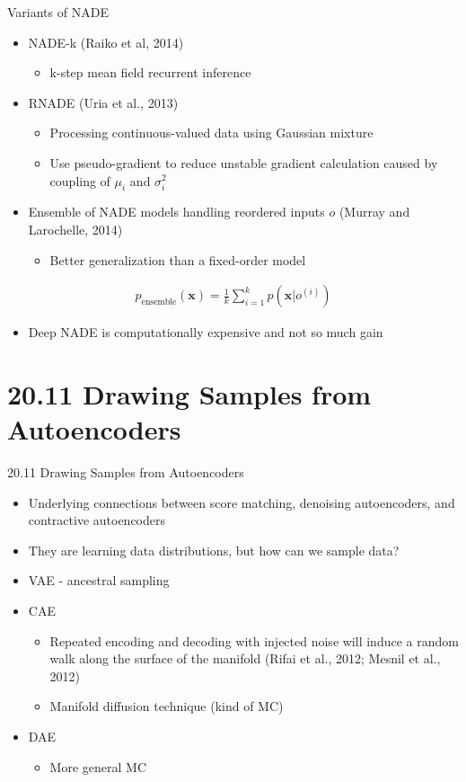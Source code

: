 \documentclass[dvipdfmx,presentation]{beamer}
\def\bf{\mathbf}
\begin{document}
\begin{frame}[label={sec:orgheadline42}]{Variants of NADE}
\begin{itemize}
\item NADE-k (Raiko et al, 2014)
\begin{itemize}
\item k-step mean field recurrent inference
\end{itemize}
\item RNADE (Uria et al., 2013)
\begin{itemize}
\item Processing continuous-valued data using Gaussian mixture
\item Use pseudo-gradient to reduce unstable gradient calculation caused by coupling of \(\mu_{i}\) and \(\sigma_{i}^{2}\)
\end{itemize}
\item Ensemble of NADE models handling reordered inputs \(o\) (Murray and Larochelle, 2014)
\begin{itemize}
\item Better generalization than a fixed-order model
\end{itemize}
\end{itemize}
\begin{align*}
p_{\mathrm{ensemble}}(\bf{x}) = \frac{1}{k} \sum_{i=1}^{k} p(\bf{x} | o^{(i)})
\end{align*}
\begin{itemize}
\item Deep NADE is computationally expensive and not so much gain
\end{itemize}
\end{frame}

\section{20.11 Drawing Samples from Autoencoders}
\label{sec:orgheadline47}
\begin{frame}[label={sec:orgheadline44}]{20.11 Drawing Samples from Autoencoders}
\begin{itemize}
\item Underlying connections between score matching, denoising autoencoders, and contractive autoencoders
\item They are learning data distributions, but how can we sample data?
\item VAE - ancestral sampling
\item CAE 
\begin{itemize}
\item Repeated encoding and decoding with injected noise will induce a random walk along the surface of the manifold (Rifai et al., 2012; Mesnil et al., 2012)
\item Manifold diffusion technique (kind of MC)
\end{itemize}
\item DAE
\begin{itemize}
\item More general MC
\end{itemize}
\end{itemize}
\end{frame}
\end{document}
